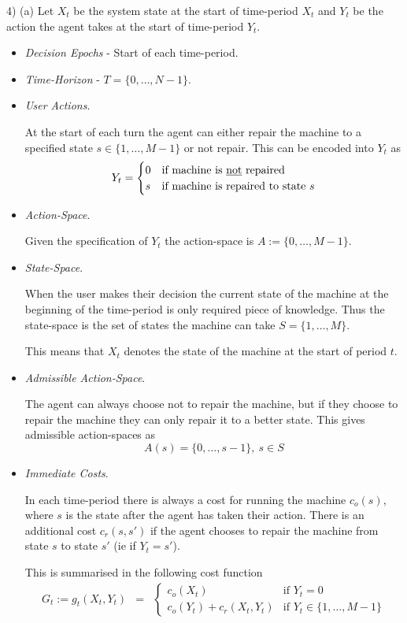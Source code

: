 \documentclass[11pt,a4paper]{article}
\begin{document}
\begin{answer}{4) (a)}
  Let $X_t$ be the system state at the start of time-period $X_t$ and $Y_t$ be the action the agent takes at the start of time-period $Y_t$.
  \begin{itemize}
    \item \textit{Decision Epochs} - Start of each time-period.
    \item \textit{Time-Horizon} - $T=\{0,\dots,N-1\}$.
    \item \textit{User Actions}.
    \par At the start of each turn the agent can either repair the machine to a specified state $s\in\{1,\dots,M-1\}$ or not repair. This can be encoded into $Y_t$ as
    \[
      Y_t=\begin{cases}
            0&\text{if machine is \underline{not} repaired}\\
            s&\text{if machine is repaired to state }s
           \end{cases}
    \]

    \item \textit{Action-Space}.
    \par Given the specification of $Y_t$ the action-space is $A:=\{0,\dots,M-1\}$.

    \item \textit{State-Space}.
    \par When the user makes their decision the current state of the machine at the beginning of the time-period is only required piece of knowledge. Thus the state-space is the set of states the machine can take $S=\{1,\dots,M\}$.
    \par This means that $X_t$ denotes the state of the machine at the start of period $t$.

    \item \textit{Admissible Action-Space}.
    \par The agent can always choose not to repair the machine, but if they choose to repair the machine they can only repair it to a better state. This gives admissible action-spaces as
    \[ A(s)=\{0,\dots,s-1\},\ s\in S \]

    \item \textit{Immediate Costs}.
    \par In each time-period there is always a cost for running the machine $c_o(s)$, where $s$ is the state after the agent has taken their action. There is an additional cost $c_r(s,s')$ if the agent chooses to repair the machine from state $s$ to state $s'$ (ie if $Y_t=s'$).
    \par This is summarised in the following cost function
    \[\begin{array}{rcl}
      G_t:=g_t(X_t,Y_t)&=&\begin{cases}
              c_o(X_t)&\text{if }Y_t=0\\
              c_o(Y_t)+c_r(X_t,Y_t)&\text{if }Y_t\in\{1,\dots,M-1\}
            \end{cases}
    \end{array}\]


\end{itemize}
\end{answer}
\end{document}

